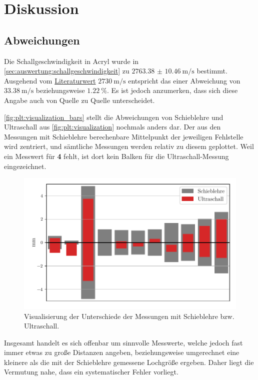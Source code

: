 \section{Diskussion}
\label{sec:diskussion}

\subsection{Abweichungen}

Die Schallgeschwindigkeit in Acryl wurde in \autoref{sec:auswertung:schallgeschwindigkeit}
zu $\SI{2763.38(1046)}{\meter\per\second}$ bestimmt.
Ausgehend vom \hyperref[tab:vorbereitung]{Literaturwert} $\SI{2730}{\meter\per\second}$
entspricht das einer Abweichung von $\SI{33.38}{\meter\per\second}$ beziehungsweise $\SI{1.22}{\percent}$.
Es ist jedoch anzumerken,
dass sich diese Angabe auch von Quelle zu Quelle unterscheidet.

\autoref{fig:plt:visualization_bars} stellt die Abweichungen
von Schieblehre und Ultraschall aus \autoref{fig:plt:visualization}
nochmals anders dar.
Der aus den Messungen mit Schieblehre berechenbare Mittelpunkt der jeweiligen Fehlstelle wird zentriert,
und sämtliche Messungen werden relativ zu diesem geplottet.
Weil ein Messwert für \textbf{4} fehlt, ist dort kein Balken für die Ultraschall-Messung eingezeichnet.

\begin{figure}[H]
  \centering
  \includegraphics[width=\textwidth]{build/plt/visualization_bars.pdf}
  \caption{Visualisierung der Unterschiede der Messungen mit Schieblehre bzw. Ultraschall.}
  \label{fig:plt:visualization_bars}
\end{figure}

Insgesamt handelt es sich offenbar um sinnvolle Messwerte,
welche jedoch fast immer etwas zu große Distanzen angeben,
beziehungsweise umgerechnet eine kleinere als die mit der Schieblehre gemessene Lochgröße ergeben.
Daher liegt die Vermutung nahe,
dass ein systematischer Fehler vorliegt.

